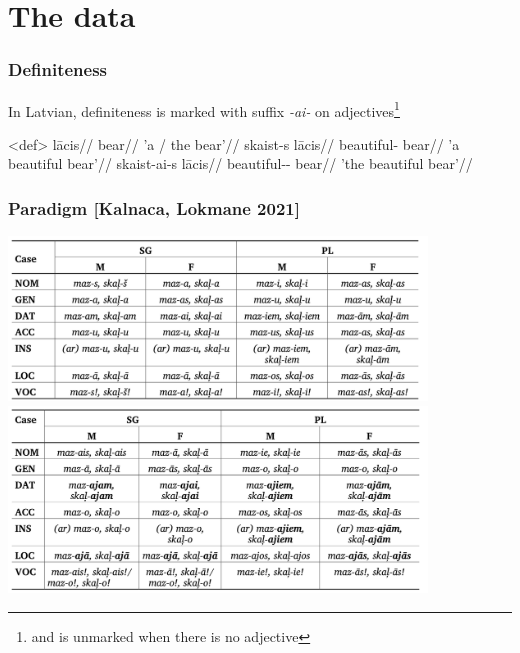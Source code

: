 \documentclass[9pt, t]{beamer}
\begin{document}
\section{The data}
\begin{frame}
    \frametitle{Definiteness}
    
    In Latvian, definiteness is marked with suffix \textit{-ai-} on adjectives\footnote{and is unmarked when there is no adjective}

    \pex<def>
        \a \begingl
            \gla lācis//
            \glb bear//
            \glft 'a / the bear'//
        \endgl
        \a \begingl
            \gla skaist-s lācis//
            \glb beautiful-\Nom{} bear//
            \glft 'a beautiful bear'//
        \endgl
        \a \begingl
            \gla skaist-ai-s lācis//
            \glb beautiful-\Def{}-\Nom{} bear//
            \glft 'the beautiful bear'//
        \endgl
    \xe

\end{frame}

\begin{frame}
    \frametitle{Paradigm [Kalnaca, Lokmane 2021]}

    \includegraphics[width=30em]{lat paradigm 1.png}
    \includegraphics[width=30em]{lat paradigm 2.png}

\end{frame}
\end{document}
